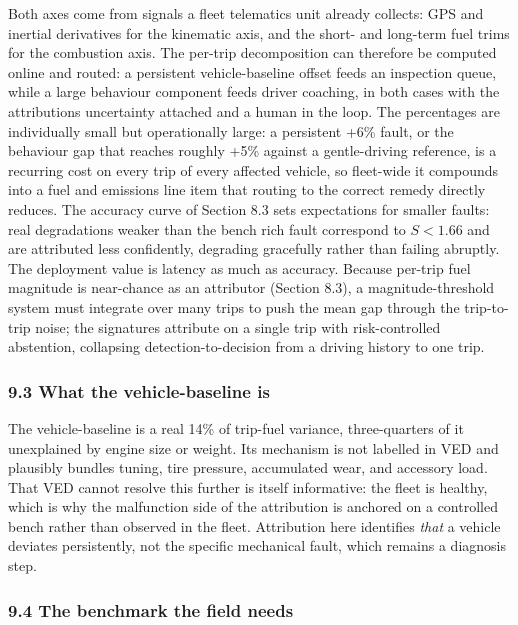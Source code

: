 Both axes come from signals a fleet telematics unit already collects:
GPS and inertial derivatives for the kinematic axis, and the short- and
long-term fuel trims for the combustion axis. The per-trip decomposition
can therefore be computed online and routed: a persistent
vehicle-baseline offset feeds an inspection queue, while a large
behaviour component feeds driver coaching, in both cases with the
attribution\textquotesingle s uncertainty attached and a human in the
loop. The percentages are individually small but operationally large: a
persistent +6\% fault, or the behaviour gap that reaches roughly +5\%
against a gentle-driving reference, is a recurring cost on every trip of
every affected vehicle, so fleet-wide it compounds into a fuel and
emissions line item that routing to the correct remedy directly reduces.
The accuracy curve of Section 8.3 sets expectations for smaller faults:
real degradations weaker than the bench rich fault correspond to
\(S<1.66\) and are attributed less confidently, degrading gracefully
rather than failing abruptly. The deployment value is latency as much as
accuracy. Because per-trip fuel magnitude is near-chance as an
attributor (Section 8.3), a magnitude-threshold system must integrate
over many trips to push the mean gap through the trip-to-trip noise; the
signatures attribute on a single trip with risk-controlled abstention,
collapsing detection-to-decision from a driving history to one trip.

\subsubsection{9.3 What the vehicle-baseline
is}\label{what-the-vehicle-baseline-is}

The vehicle-baseline is a real 14\% of trip-fuel variance,
three-quarters of it unexplained by engine size or weight. Its mechanism
is not labelled in VED and plausibly bundles tuning, tire pressure,
accumulated wear, and accessory load. That VED cannot resolve this
further is itself informative: the fleet is healthy, which is why the
malfunction side of the attribution is anchored on a controlled bench
rather than observed in the fleet. Attribution here identifies
\emph{that} a vehicle deviates persistently, not the specific mechanical
fault, which remains a diagnosis step.

\subsubsection{9.4 The benchmark the field
needs}\label{the-benchmark-the-field-needs}

